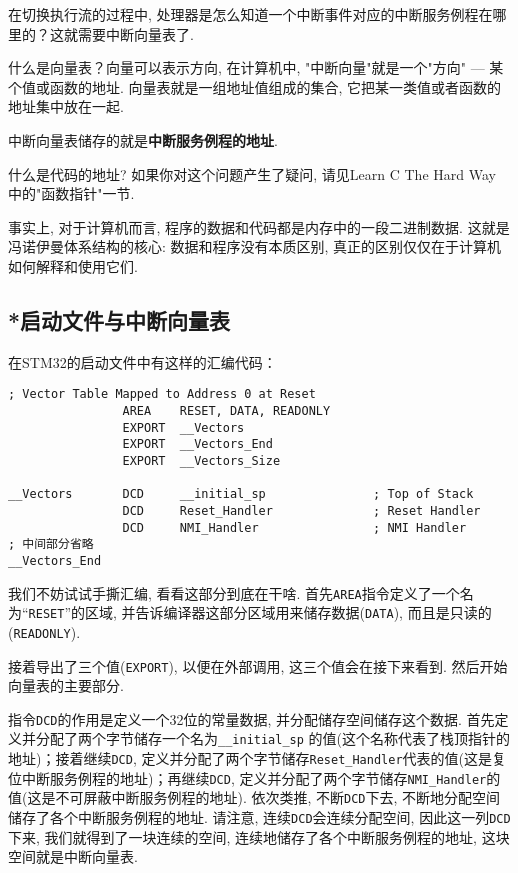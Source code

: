 在切换执行流的过程中, 处理器是怎么知道一个中断事件对应的中断服务例程在哪里的？这就需要中断向量表了.

什么是向量表？向量可以表示方向, 在计算机中, "中断向量"就是一个"方向" --- 某个值或函数的地址. 向量表就是一组地址值组成的集合, 它把某一类值或者函数的地址集中放在一起.

中断向量表储存的就是\textbf{中断服务例程的地址}.

\begin{theorem}
	什么是代码的地址? 如果你对这个问题产生了疑问, 请见Learn C The Hard Way 中的"函数指针"一节.

	\label{funcptr}

	事实上, 对于计算机而言, 程序的数据和代码都是内存中的一段二进制数据. 这就是冯诺伊曼体系结构的核心: 数据和程序没有本质区别, 真正的区别仅仅在于计算机如何解释和使用它们.
\end{theorem}

\subsection{*启动文件与中断向量表}

在STM32的启动文件中有这样的汇编代码：

\begin{lstlisting}
; Vector Table Mapped to Address 0 at Reset
                AREA    RESET, DATA, READONLY
                EXPORT  __Vectors
                EXPORT  __Vectors_End
                EXPORT  __Vectors_Size

__Vectors       DCD     __initial_sp               ; Top of Stack
                DCD     Reset_Handler              ; Reset Handler
                DCD     NMI_Handler                ; NMI Handler
; 中间部分省略
__Vectors_End
\end{lstlisting}

我们不妨试试手撕汇编, 看看这部分到底在干啥. 首先\verb|AREA|指令定义了一个名为“\verb|RESET|”的区域, 并告诉编译器这部分区域用来储存数据(\verb|DATA|), 而且是只读的(\verb|READONLY|).

接着导出了三个值(\verb|EXPORT|), 以便在外部调用, 这三个值会在接下来看到. 然后开始向量表的主要部分.

指令\verb|DCD|的作用是定义一个32位的常量数据, 并分配储存空间储存这个数据. 首先定义并分配了两个字节储存一个名为\verb|__initial_sp|
的值(这个名称代表了栈顶指针的地址)；接着继续\verb|DCD|, 定义并分配了两个字节储存\verb|Reset_Handler|代表的值(这是复位中断服务例程的地址)；再继续\verb|DCD|, 定义并分配了两个字节储存\verb|NMI_Handler|的值(这是不可屏蔽中断服务例程的地址).
依次类推, 不断\verb|DCD|下去, 不断地分配空间储存了各个中断服务例程的地址. 请注意, 连续\verb|DCD|会连续分配空间, 因此这一列\verb|DCD|下来, 我们就得到了一块连续的空间, 连续地储存了各个中断服务例程的地址, 这块空间就是中断向量表.


